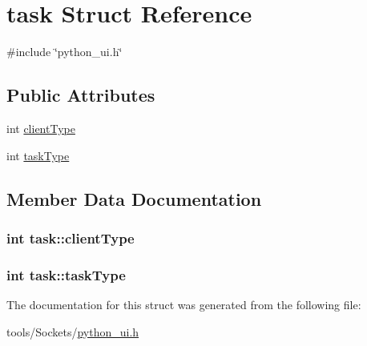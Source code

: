 \hypertarget{structtask}{\section{task Struct Reference}
\label{structtask}
}


{\ttfamily \#include \char`\"{}python\-\_\-ui.\-h\char`\"{}}

\subsection*{Public Attributes}
\begin{DoxyCompactItemize}
\item 
int \hyperlink{structtask_a4c83879e4ad45d18b3043aeeab6f648d}{client\-Type}
\item 
int \hyperlink{structtask_ae14248ab03604e381850d27d3f256287}{task\-Type}
\end{DoxyCompactItemize}


\subsection{Member Data Documentation}
\hypertarget{structtask_a4c83879e4ad45d18b3043aeeab6f648d}{
\subsubsection[{client\-Type}]{\setlength{\rightskip}{0pt plus 5cm}int task\-::client\-Type}}\label{structtask_a4c83879e4ad45d18b3043aeeab6f648d}
\hypertarget{structtask_ae14248ab03604e381850d27d3f256287}{
\subsubsection[{task\-Type}]{\setlength{\rightskip}{0pt plus 5cm}int task\-::task\-Type}}\label{structtask_ae14248ab03604e381850d27d3f256287}


The documentation for this struct was generated from the following file\-:\begin{DoxyCompactItemize}
\item 
tools/\-Sockets/\hyperlink{python__ui_8h}{python\-\_\-ui.\-h}\end{DoxyCompactItemize}
